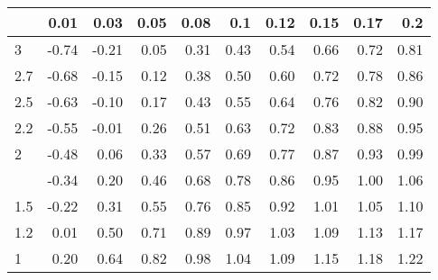 
\begin{tabular}{lrrrrrrrrr}
\toprule
  & 0.01 & 0.03 & 0.05 & 0.08 & 0.1 & 0.12 & 0.15 & 0.17 & 0.2\\
\midrule
3 & -0.74 & -0.21 & 0.05 & 0.31 & 0.43 & 0.54 & 0.66 & 0.72 & 0.81\\
2.7 & -0.68 & -0.15 & 0.12 & 0.38 & 0.50 & 0.60 & 0.72 & 0.78 & 0.86\\
2.5 & -0.63 & -0.10 & 0.17 & 0.43 & 0.55 & 0.64 & 0.76 & 0.82 & 0.90\\
2.2 & -0.55 & -0.01 & 0.26 & 0.51 & 0.63 & 0.72 & 0.83 & 0.88 & 0.95\\
2 & -0.48 & 0.06 & 0.33 & 0.57 & 0.69 & 0.77 & 0.87 & 0.93 & 0.99\\
\addlinespace
1.7 & -0.34 & 0.20 & 0.46 & 0.68 & 0.78 & 0.86 & 0.95 & 1.00 & 1.06\\
1.5 & -0.22 & 0.31 & 0.55 & 0.76 & 0.85 & 0.92 & 1.01 & 1.05 & 1.10\\
1.2 & 0.01 & 0.50 & 0.71 & 0.89 & 0.97 & 1.03 & 1.09 & 1.13 & 1.17\\
1 & 0.20 & 0.64 & 0.82 & 0.98 & 1.04 & 1.09 & 1.15 & 1.18 & 1.22\\
\bottomrule
\end{tabular}
